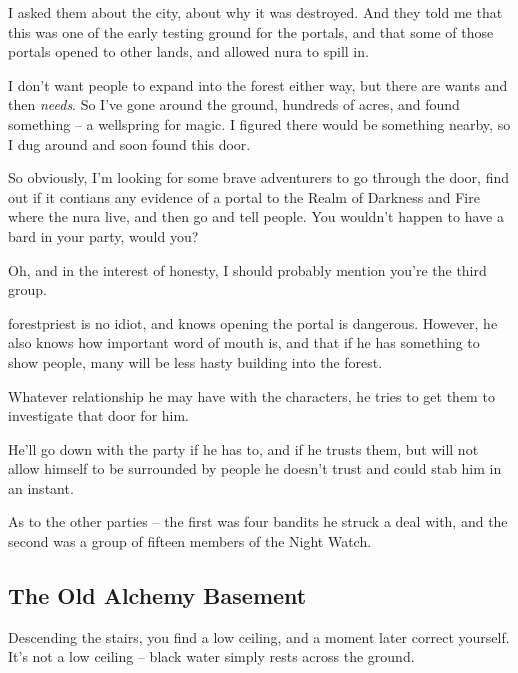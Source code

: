 \begin{multicols}{2}
\begin{speechtext}
	I asked them about the city, about why it was destroyed.  And they told me that this was one of the early testing ground for the portals, and that some of those portals opened to other lands, and allowed nura to spill in.

	I don't want people to expand into the forest either way, but there are wants and then \emph{needs}.  So I've gone around the ground, hundreds of acres, and found something -- a wellspring for magic.  I figured there would be something nearby, so I dug around and soon found this door.

	So obviously, I'm looking for some brave adventurers to go through the door, find out if it contians any evidence of a portal to the Realm of Darkness and Fire where the nura live, and then go and tell people.  You wouldn't happen to have a bard in your party, would you?

	Oh, and in the interest of honesty, I should probably mention you're the third group.

\end{speechtext}

\Gls{forestpriest} is no idiot, and knows opening the portal is dangerous.  However, he also knows how important word of mouth is, and that if he has something to show people, many will be less hasty building into the forest.

Whatever relationship he may have with the characters, he tries to get them to investigate that door for him.

He'll go down with the party if he has to, and if he trusts them, but will not allow himself to be surrounded by people he doesn't trust and could stab him in an instant.

As to the other parties -- the first was four bandits he struck a deal with, and the second was a group of fifteen members of the Night Watch.



\subsection{The Old Alchemy Basement}\label{old_alchemy_basement}\setcounter{list}{0}

\begin{boxtext}
	Descending the stairs, you find a low ceiling, and a moment later correct yourself.  It's not a low ceiling -- black water simply rests across the ground.


\end{boxtext}
\end{multicols}

